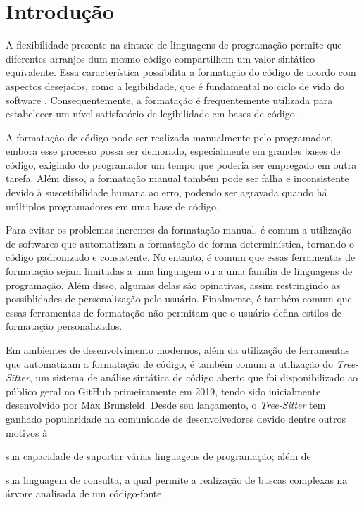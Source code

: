 \documentclass
  [11pt,a4paper,english,brazil,openright,sumario=tradicional,twoside]
  {abntex2}
\newcommand{\treesitter}{\textit{Tree-Sitter}\xspace}
\begin{document}

  \textual


  \chapter{Introdução}

  A flexibilidade presente na sintaxe de linguagens de programação permite que
  diferentes arranjos dum mesmo código compartilhem um valor sintático
  equivalente. Essa característica possibilita a formatação do código de acordo
  com aspectos desejados, como a legibilidade, que é fundamental no ciclo de
  vida do software
  \cites[546]{buse-2009-learning}[1]{oliveira-2020-evaluating}.
  Consequentemente, a formatação é frequentemente utilizada para estabelecer um
  nível satisfatório de legibilidade em bases de código.

  A formatação de código pode ser realizada manualmente pelo programador,
  embora esse processo possa ser demorado, especialmente em grandes bases de
  código, exigindo do programador um tempo que poderia ser empregado em outra
  tarefa. Além disso, a formatação manual também pode ser falha e inconsistente
  devido à suscetibilidade humana ao erro, podendo ser agravada quando há
  múltiplos programadores em uma base de código.

  Para evitar os problemas inerentes da formatação manual, é comum a utilização
  de softwares que automatizam a formatação de forma determinística, tornando o
  código padronizado e consistente. No entanto, é comum que essas ferramentas
  de formatação sejam limitadas a uma linguagem ou a uma família de linguagens
  de programação. Além disso, algumas delas são opinativas, assim restringindo
  as possiblidades de personalização pelo usuário. Finalmente, é também comum
  que essas ferramentas de formatação não permitam que o usuário defina estilos
  de formatação personalizados.

  Em ambientes de desenvolvimento modernos, além da utilização de ferramentas
  que automatizam a formatação de código, é também comum a utilização do
  \treesitter \cite{tree-sitter-2018-tree}, um sistema de análise sintática de
  código aberto que foi disponibilizado ao público geral no GitHub
  primeiramente em 2019, tendo sido inicialmente desenvolvido por Max
  Brunsfeld. Desde seu lançamento, o \treesitter tem ganhado popularidade na
  comunidade de desenvolvedores devido dentre outros motivos à
  \begin{inparaenum}
    \item sua capacidade de suportar várias linguagens de programação; além de
    \item sua linguagem de consulta, a qual permite a realização de buscas
          complexas na árvore analisada de um código-fonte.
  \end{inparaenum}
\end{document}
